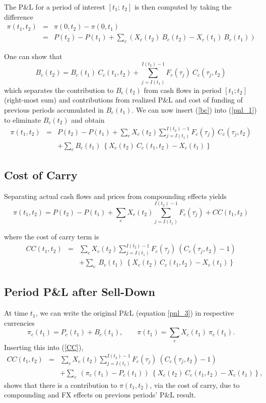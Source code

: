 The P\&L for a period of interest $[t_1;\,t_2]$ is then computed by taking the difference
\begin{eqnarray}
	\pi(t_1, t_2) &=& \pi(0,t_2) - \pi(0,t_1) \label{pnl_1} \\
		&=& P(t_2) - P(t_1) + \sum_c (X_c(t_2)\: B_c(t_2) - X_c(t_1)\: B_c(t_1))
		\nonumber
\end{eqnarray}

One can show that
\begin{equation}
	B_c(t_2) = B_c(t_1) \:C_c(t_1, t_2)
	+ \sum_{j=I(t_1)}^{I(t_2)-1}F_c(\tau_j)\:C_c(\tau_j, t_2)
\label{bc}
\end{equation}
which separates the contribution to $B_c(t_2)$ from cash flows in period $[t_1;t_2]$ (right-most sum) and contributions from realized P\&L and cost of funding of previous periods accumulated in $B_c(t_1)$. We can now insert (\ref{bc}) into (\ref{pnl_1}) to eliminate $B_c(t_2)$ and obtain
\begin{eqnarray}
	\pi(t_1, t_2) &=& P(t_2) - P(t_1)
	+ \sum_c X_c(t_2) \sum_{j=I(t_1)}^{I(t_2)-1}F_c(\tau_j)\:C_c(\tau_j, t_2)
	\nonumber\\
	&& + \sum_c B_c(t_1)\:\left\{X_c(t_2)\:C_c(t_1, t_2) - X_c(t_1)\right\} \label{pnl_1a}
\end{eqnarray}

\subsection*{Cost of Carry}

Separating actual cash flows and prices from compounding effects yields
$$
	\pi(t_1, t_2) = P(t_2) - P(t_1)
	+ \sum_c X_c(t_2)\sum_{j=I(t_1)}^{I(t_2)-1}F_c(\tau_j)
	+ CC(t_1,t_2)
$$

where the cost of carry term is
\begin{eqnarray}
CC(t_1,t_2) &=&
	\sum_c X_c(t_2)\sum_{j=I(t_1)}^{I(t_2)-1}F_c(\tau_j)\:
	\left(C_c(\tau_j, t_2) - 1\right) \nonumber\\
&& + \sum_c \:B_c(t_1)\:\left\{X_c(t_2)\:C_c(t_1, t_2) - X_c(t_1)\right\}
\label{CC}
\end{eqnarray}

\subsection*{Period P\&L after Sell-Down}

At time $t_1$, we can write the original P\&L (equation \ref{pnl_3}) in respective currencies
$$
\pi_c(t_1) = P_c(t_1) + B_c(t_1), \qquad \pi(t_1) = \sum_c X_c(t_1)\:\pi_c(t_1).
$$
Inserting this into (\ref{CC}),
\begin{eqnarray*}
CC(t_1,t_2) &=&
	\sum_c X_c(t_2)\sum_{j=I(t_1)}^{I(t_2)-1}F_c(\tau_j)\:
	\left(C_c(\tau_j, t_2) - 1\right) \\
&& + \sum_c \:(\pi_c(t_1) - P_c(t_1))\:\left\{X_c(t_2)\:C_c(t_1, t_2) - X_c(t_1)\right\},
\end{eqnarray*}
shows that there is a contribution to $\pi(t_1,t_2)$, via the cost of carry, due to compounding and FX effects on previous periods' P\&L result.

